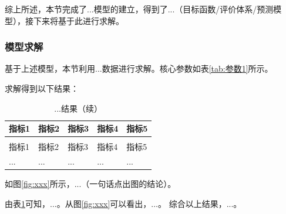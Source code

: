 综上所述，本节完成了...模型的建立，得到了...（目标函数/评价体系/预测模型），接下来将基于此进行求解。

\subsubsection{模型求解}

基于上述模型，本节利用...数据进行求解。核心参数如表\ref{tab:参数1}所示。

求解得到以下结果：

\begin{longtable}{>{\centering\arraybackslash}p{}>{\centering\arraybackslash}p{}>{\centering\arraybackslash}p{}>{\centering\arraybackslash}p{}>{\centering\arraybackslash}p{}}
  \caption{...结果}
  \label{tab:结果1} \\
  \toprule
  指标1 & 指标2 & 指标3 & 指标4 & 指标5 \\
  \midrule
  \endfirsthead
  \caption{...结果（续）} \\
  \toprule
  指标1 & 指标2 & 指标3 & 指标4 & 指标5 \\
  \midrule
  \endhead
  \bottomrule
  \endfoot
  ... & ... & ... & ... & ... \\
\end{longtable}

如图\ref{fig:xxx}所示，...（一句话点出图的结论）。


由表\ref{tab:结果1}可知，...。从图\ref{fig:xxx}可以看出，...。
综合以上结果，...。
